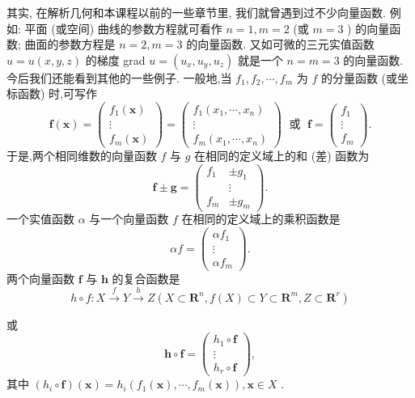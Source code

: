 其实, 在解析几何和本课程以前的一些章节里, 我们就曾遇到过不少向量函数. 例如: 平面 (或空间) 曲线的参数方程就可看作 \(n = 1,m = 2\) (或 \(m = 3\) ) 的向量函数; 曲面的参数方程是 \(n = 2,m = 3\) 的向量函数. 又如可微的三元实值函数 \(u = u\left( {x,y,z}\right)\) 的梯度 grad \(u = \left( {{u}_{x},{u}_{y},{u}_{z}}\right)\) 就是一个 \(n = m = 3\) 的向量函数. 今后我们还能看到其他的一些例子. 一般地,当 \({f}_{1},{f}_{2},\cdots ,{f}_{m}\) 为 \(f\) 的分量函数 (或坐标函数) 时,可写作
\[
\mathbf{f}\left( \mathbf{x}\right)  = \left( \begin{matrix} {f}_{1}\left( \mathbf{x}\right) \\  \vdots \\  {f}_{m}\left( \mathbf{x}\right)  \end{matrix}\right)  = \left( \begin{matrix} {f}_{1}\left( {{x}_{1},\cdots ,{x}_{n}}\right) \\  \vdots \\  {f}_{m}\left( {{x}_{1},\cdots ,{x}_{n}}\right)  \end{matrix}\right) \;\text{ 或 }\;\mathbf{f} = \left( \begin{matrix} {f}_{1} \\  \vdots \\  {f}_{m} \end{matrix}\right) .
\]
于是,两个相同维数的向量函数 \(f\) 与 \(g\) 在相同的定义域上的和 (差) 函数为
\[
\mathbf{f} \pm  \mathbf{g} = \left( \begin{matrix} {f}_{1} &  \pm  {g}_{1} \\   & \vdots \\  {f}_{m} &  \pm  {g}_{m} \end{matrix}\right) . \tag{6}
\]
一个实值函数 \(\alpha\) 与一个向量函数 \(f\) 在相同的定义域上的乘积函数是
\[
{\alpha f} = \left( \begin{matrix} \alpha {f}_{1} \\  \vdots \\  \alpha {f}_{m} \end{matrix}\right) . \tag{7}
\]
两个向量函数 \(\mathbf{f}\) 与 \(\mathbf{h}\) 的复合函数是
\[
h \circ  f : X\overset{f}{ \rightarrow  }Y\overset{h}{ \rightarrow  }Z\left( {X \subset  {\mathbf{R}}^{n},f\left( X\right)  \subset  Y \subset  {\mathbf{R}}^{m},Z \subset  {\mathbf{R}}^{r}}\right)
\]


或
\[
\mathbf{h} \circ  \mathbf{f} = \left( \begin{matrix} {h}_{1} \circ  \mathbf{f} \\  \vdots \\  {h}_{r} \circ  \mathbf{f} \end{matrix}\right) , \tag{8}
\]
其中 \(\left( {{h}_{i} \circ  \mathbf{f}}\right) \left( \mathbf{x}\right)  = {h}_{i}\left( {{f}_{1}\left( \mathbf{x}\right) ,\cdots ,{f}_{m}\left( \mathbf{x}\right) }\right) ,\mathbf{x} \in  X\) .

